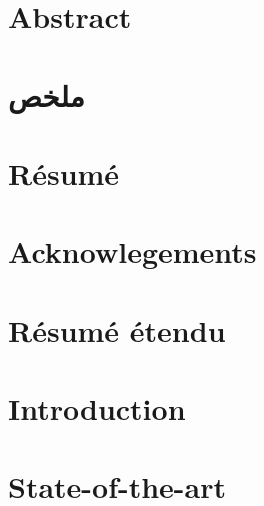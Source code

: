 \documentclass[12pt, twoside]{book}
\begin{document}
    \dominitoc
    \doparttoc
    \frontmatter
    \pagestyle{plain}
   
    
    
    
    \chapter{Abstract}
        \adjustmtc
        

    \chapter{ملخص}
        \adjustmtc
        

    \chapter{Résumé}
        \adjustmtc
        

    \tableofcontents
    \listoffigures
    \listoftables

    \chapter{Acknowlegements}
        \adjustmtc
        

    \mainmatter

    \chapter*{Résumé étendu}
        \adjustmtc
        

    \chapter{Introduction}
        \label{chap::introduction}
        
    
    \chapter{State-of-the-art}
        \label{chap::state_of_the_art}
        
\end{document}
